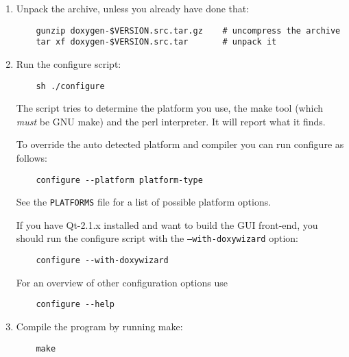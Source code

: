 \begin{enumerate}
\item Unpack the archive, unless you already have done that:



\footnotesize\begin{verbatim}
    gunzip doxygen-$VERSION.src.tar.gz    # uncompress the archive
    tar xf doxygen-$VERSION.src.tar       # unpack it
\end{verbatim}
\normalsize


\item Run the configure script:



\footnotesize\begin{verbatim}
    sh ./configure
\end{verbatim}
\normalsize


The script tries to determine the platform you use, the make tool (which {\em must\/} be GNU make) and the perl interpreter. It will report what it finds.

To override the auto detected platform and compiler you can run configure as follows:



\footnotesize\begin{verbatim}
    configure --platform platform-type
\end{verbatim}
\normalsize


See the {\tt PLATFORMS} file for a list of possible platform options.

If you have Qt-2.1.x installed and want to build the GUI front-end, you should run the configure script with the {\tt --with-doxywizard} option:



\footnotesize\begin{verbatim}
    configure --with-doxywizard
\end{verbatim}
\normalsize


For an overview of other configuration options use



\footnotesize\begin{verbatim}
    configure --help
\end{verbatim}
\normalsize


\item Compile the program by running make:



\footnotesize\begin{verbatim}
    make
\end{verbatim}
\normalsize



\end{enumerate}
